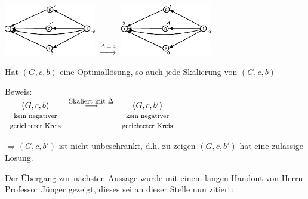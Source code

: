 \includegraphics[width=4cm]{bilder/4-4Skalierung2} 
$\stackrel{\Delta=4}{\rightarrow}$ 
\includegraphics[width=4cm]{bilder/4-4Skalierung3}

\begin{lemma}
Hat $(G,c,b)$ eine Optimallösung, so auch jede Skalierung von $(G,c,b)$
\end{lemma}
Beweis:\\
$\begin{array}{ccc}
(G,c,b)&\stackrel{\mbox{\footnotesize Skaliert mit
$\Delta$}}{\longrightarrow}&(G,c,b')\\
\mbox{\footnotesize kein negativer}&&\mbox{\footnotesize kein negativer}\\
\mbox{\footnotesize gerichteter Kreis}&&\mbox{\footnotesize gerichteter
Kreis}
\end{array}$

$\Rightarrow (G,c,b')$ ist nicht unbeschränkt, d.h. zu zeigen $(G,c,b')$ hat
eine zulässige Lösung.

Der Übergang zur nächsten Aussage wurde mit einem langen Handout von Herrn
Professor Jünger gezeigt, dieses sei an dieser Stelle nun zitiert:

